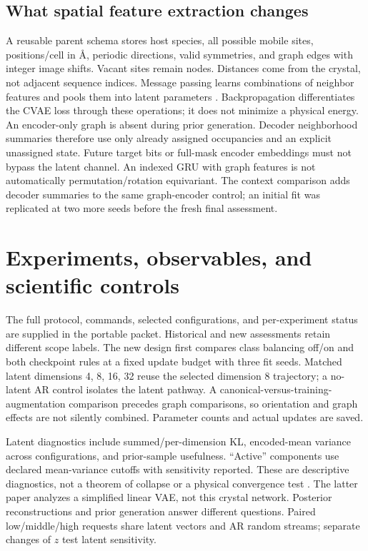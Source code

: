 \documentclass[10pt]{article}
\begin{document}
\subsection{What spatial feature extraction changes}
A reusable parent schema stores host species, all possible mobile sites,
positions/cell in \AA, periodic directions, valid symmetries, and graph edges
with integer image shifts. Vacant sites remain nodes. Distances come from the
crystal, not adjacent sequence indices. Message passing learns combinations of
neighbor features and pools them into latent parameters \cite{gilmer2017}.
Backpropagation differentiates the CVAE loss through these operations; it does
not minimize a physical energy. An encoder-only graph is absent during prior
generation. Decoder neighborhood summaries therefore use only already assigned
occupancies and an explicit unassigned state. Future target bits or full-mask
encoder embeddings must not bypass the latent channel. An indexed GRU with graph
features is not automatically permutation/rotation equivariant. The context
comparison adds decoder summaries to the same graph-encoder control; an initial
fit was replicated at two more seeds before the fresh final assessment.
\newpage

\section{Experiments, observables, and scientific controls}
The full protocol, commands, selected configurations, and per-experiment status
are supplied in the portable packet. Historical and new assessments retain
different scope labels. The new design first compares class balancing off/on
and both checkpoint rules at a fixed update budget with three fit seeds.
Matched latent dimensions 4, 8, 16, 32 reuse the selected dimension 8 trajectory;
a no-latent AR control isolates the latent pathway. A canonical-versus-training-
augmentation comparison precedes graph comparisons, so orientation and graph
effects are not silently combined. Parameter counts and actual updates are saved.

Latent diagnostics include summed/per-dimension KL, encoded-mean variance across
configurations, and prior-sample usefulness. ``Active'' components use declared
mean-variance cutoffs with sensitivity reported. These are descriptive
diagnostics, not a theorem of collapse or a physical convergence test
\cite{dieng2019,ichikawa2024}. The latter paper analyzes a simplified linear VAE,
not this crystal network. Posterior reconstructions and prior generation answer
different questions. Paired low/middle/high requests share latent vectors and
AR random streams; separate changes of $z$ test latent sensitivity.
\end{document}
